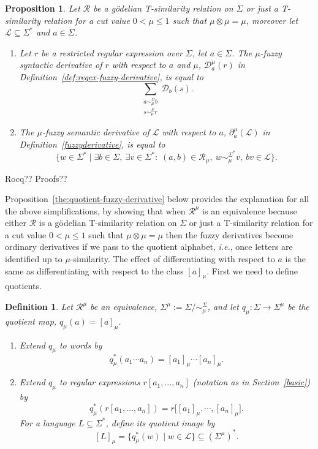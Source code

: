 \documentclass{article}
\newcommand{\cR}{{\mathcal R}}
\def\cut{\mu}
\newtheorem{definition}{Definition}[section]
\newtheorem{proposition}{Proposition}[section]
\begin{document}
\begin{proposition}\label{fuzzyderivativeGodel}
Let $\cR$ be a g\"odelian T-similarity relation on $\Sigma$ or just a T-similarity relation for a cut value $0 < \cut \le 1$ such that $\mu\otimes\mu=\mu$, moreover let $\mathcal{L}\subseteq\Sigma^*$ and $a\in\Sigma$. 
\begin{enumerate}
\item \label{def:regex-fuzzy-derivative-godel}
Let $r$ be a restricted regular expression over $\Sigma$, let $a\in\Sigma$. The $\mu$-fuzzy syntactic derivative  of $r$ with respect to $a$ and
$\cut$, $\mathcal D_a^\cut(r)$ in Definition~\ref{def:regex-fuzzy-derivative}, is equal to
\[  \sum\limits_{\substack{a\sim_\cut^\Sigma b\\ s\sim_\cut^E r}}
  \mathcal D_b(s).
\]
\item The $\cut$-fuzzy semantic
derivative of $\mathcal{L}$ with respect to $a$, $\partial_a^\cut(\mathcal{L})$ in Definition~\ref{fuzzyderivative}, is equal to
$$
\{w \in \Sigma^* \mid
  \exists b \in \Sigma,\ \exists v\in\Sigma^*
  :\;
  (a,b)\in\cR_\cut,\ w\sim_\cut^{\Sigma^*}v,\ bv\in\mathcal{L}
\}.
$$
\end{enumerate}
\end{proposition}
{\color{red} Rocq?? Proofs??}

Proposition~\ref{the:quotient-fuzzy-derivative} below provides the explanation for all the above simplifications, by showing that when $\cR^\mu$ is an equivalence because either $\cR$ is a g\"odelian T-similarity relation on $\Sigma$ or just a T-similarity relation for a cut value $0<\cut \le 1$ such that $\mu\otimes\mu=\mu$ then the fuzzy derivatives become ordinary derivatives if we pass to the quotient alphabet, {\em i.e.}, once letters are identified up to
$\cut$-similarity. The effect of differentiating with respect to $a$ is the same as
differentiating with respect to the class $[a]_\cut$. First we need to define quotients.


\begin{definition}\label{def:quotient-language-fuzzy}
Let $\cR^\mu$ be an equivalence, $\Sigma^\cut := \Sigma/{\sim_\cut^\Sigma}$, and let
$q_\cut:\Sigma\to\Sigma^\cut$ be the quotient map, $q_\cut(a)=[a]_\cut$.\begin{enumerate}
\item Extend $q_\cut$ to words by
\[
  q_\cut^*(a_1\cdots a_n) = [a_1]_\cut \cdots [a_n]_\cut.
\]
\item Extend $q_\cut$ to regular expressions $r[a_1,\ldots,a_n]$ (notation as in Section~\ref{basic}) by
\[
  q_\cut^*(r[a_1,\ldots,a_n]) = r\bigl[[a_1]_\cut, \cdots, [a_n]_\cut\bigr].
\]
For a language $ L \subseteq \Sigma^*$, define its quotient image by
\[
  [L]_\cut %
  = \{q_\cut^*(w)\mid w\in\mathcal L\}
  \subseteq (\Sigma^\cut)^*.
\]
\end{enumerate}
\end{definition}
\end{document}

